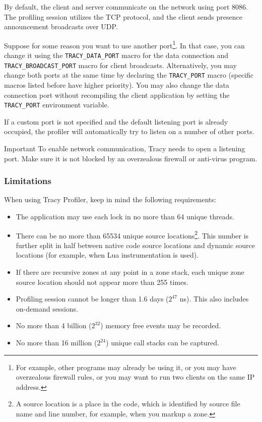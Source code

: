 \documentclass[hidelinks,titlepage,a4paper,twoside]{article}
\begin{document}
By default, the client and server communicate on the network using port 8086. The profiling session utilizes the TCP protocol, and the client sends presence announcement broadcasts over UDP.

Suppose for some reason you want to use another port\footnote{For example, other programs may already be using it, or you may have overzealous firewall rules, or you may want to run two clients on the same IP address.}. In that case, you can change it using the \texttt{TRACY\_DATA\_PORT} macro for the data connection and \texttt{TRACY\_BROADCAST\_PORT} macro for client broadcasts. Alternatively, you may change both ports at the same time by declaring the \texttt{TRACY\_PORT} macro (specific macros listed before have higher priority). You may also change the data connection port without recompiling the client application by setting the \texttt{TRACY\_PORT} environment variable.

If a custom port is not specified and the default listening port is already occupied, the profiler will automatically try to listen on a number of other ports.

\begin{bclogo}[
noborder=true,
couleur=black!5,
logo=\bcbombe
]{Important}
To enable network communication, Tracy needs to open a listening port. Make sure it is not blocked by an overzealous firewall or anti-virus program.
\end{bclogo}

\subsubsection{Limitations}

When using Tracy Profiler, keep in mind the following requirements:

\begin{itemize}
\item The application may use each lock in no more than 64 unique threads.
\item There can be no more than 65534 unique source locations\footnote{A source location is a place in the code, which is identified by source file name and line number, for example, when you markup a zone.}. This number is further split in half between native code source locations and dynamic source locations (for example, when Lua instrumentation is used).
\item If there are recursive zones at any point in a zone stack, each unique zone source location should not appear more than 255 times.
\item Profiling session cannot be longer than 1.6 days ($2^{47}$ \si{\nano\second}). This also includes on-demand sessions.
\item No more than 4 billion ($2^{32}$) memory free events may be recorded.
\item No more than 16 million ($2^{24}$) unique call stacks can be captured.
\end{itemize}
\end{document}
